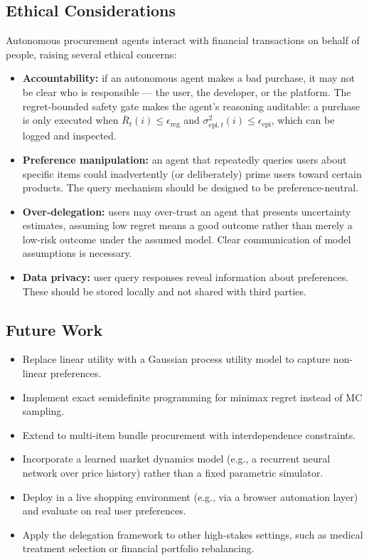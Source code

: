 \documentclass[11pt,letterpaper]{article}
\newcommand{\epsreg}{\epsilon_{\mathrm{reg}}}
\newcommand{\epsepi}{\epsilon_{\mathrm{epi}}}
\newcommand{\Rbar}{\bar{R}}
\begin{document}
\subsection{Ethical Considerations}

Autonomous procurement agents interact with financial transactions on behalf of people, raising several ethical concerns:
\begin{itemize}[nosep]
    \item \textbf{Accountability:} if an autonomous agent makes a bad purchase, it may not be clear who is responsible --- the user, the developer, or the platform.  The regret-bounded safety gate makes the agent's reasoning auditable: a purchase is only executed when $\Rbar_t(i) \leq \epsreg$ and $\sigma_{\mathrm{epi},t}^2(i) \leq \epsepi$, which can be logged and inspected.
    \item \textbf{Preference manipulation:} an agent that repeatedly queries users about specific items could inadvertently (or deliberately) prime users toward certain products.  The query mechanism should be designed to be preference-neutral.
    \item \textbf{Over-delegation:} users may over-trust an agent that presents uncertainty estimates, assuming low regret means a good outcome rather than merely a low-risk outcome under the assumed model.  Clear communication of model assumptions is necessary.
    \item \textbf{Data privacy:} user query responses reveal information about preferences.  These should be stored locally and not shared with third parties.
\end{itemize}

\subsection{Future Work}

\begin{itemize}[nosep]
    \item Replace linear utility with a Gaussian process utility model to capture non-linear preferences.
    \item Implement exact semidefinite programming for minimax regret instead of MC sampling.
    \item Extend to multi-item bundle procurement with interdependence constraints.
    \item Incorporate a learned market dynamics model (e.g., a recurrent neural network over price history) rather than a fixed parametric simulator.
    \item Deploy in a live shopping environment (e.g., via a browser automation layer) and evaluate on real user preferences.
    \item Apply the delegation framework to other high-stakes settings, such as medical treatment selection or financial portfolio rebalancing.
\end{itemize}
\end{document}
